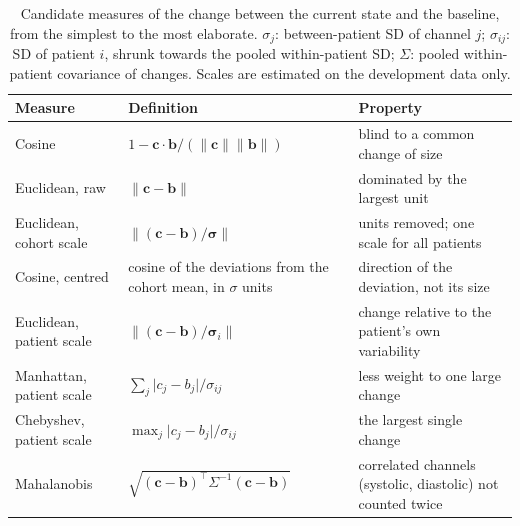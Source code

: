 \begin{table}[htbp]
\centering\footnotesize
\caption{Candidate measures of the change between the current state and the baseline, from the simplest to the most elaborate. $\sigma_j$: between-patient SD of channel $j$; $\sigma_{ij}$: SD of patient $i$, shrunk towards the pooled within-patient SD; $\Sigma$: pooled within-patient covariance of changes. Scales are estimated on the development data only.}\label{tab:state-measures}
\begin{tabularx}{\textwidth}{@{}>{\raggedright\arraybackslash}p{3.0cm} >{\raggedright\arraybackslash}p{4.4cm} X@{}}
\toprule
\textbf{Measure} & \textbf{Definition} & \textbf{Property} \\
\midrule
Cosine & $1 - \mathbf{c}\cdot\mathbf{b}/(\lVert\mathbf{c}\rVert\lVert\mathbf{b}\rVert)$ & blind to a common change of size \\
Euclidean, raw & $\lVert\mathbf{c} - \mathbf{b}\rVert$ & dominated by the largest unit \\
Euclidean, cohort scale & $\lVert(\mathbf{c} - \mathbf{b})/\boldsymbol{\sigma}\rVert$ & units removed; one scale for all patients \\
Cosine, centred & cosine of the deviations from the cohort mean, in $\sigma$ units & direction of the deviation, not its size \\
Euclidean, patient scale & $\lVert(\mathbf{c} - \mathbf{b})/\boldsymbol{\sigma}_i\rVert$ & change relative to the patient's own variability \\
Manhattan, patient scale & $\sum_j \lvert c_j - b_j\rvert/\sigma_{ij}$ & less weight to one large change \\
Chebyshev, patient scale & $\max_j \lvert c_j - b_j\rvert/\sigma_{ij}$ & the largest single change \\
Mahalanobis & $\sqrt{(\mathbf{c} - \mathbf{b})^{\top}\Sigma^{-1}(\mathbf{c} - \mathbf{b})}$ & correlated channels (systolic, diastolic) not counted twice \\
\bottomrule
\end{tabularx}
\end{table}

